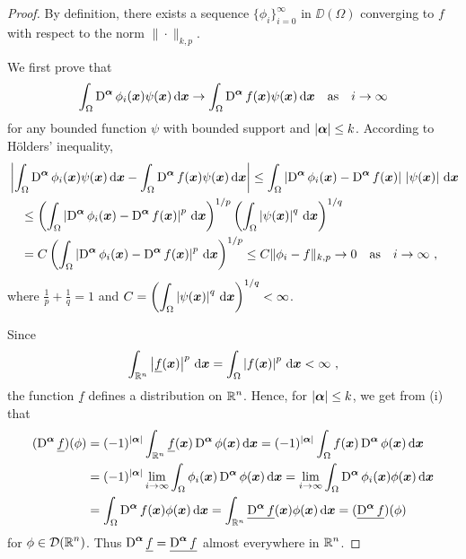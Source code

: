 \begin{proof}
By definition, there exists a sequence
$\displaystyle \{\phi_i\}_{i=0}^\infty$ in
$\DD(\Omega)$ converging to $f$ with respect to the norm
$\|\cdot\|_{k,p}$.

 We first prove that
\[
\int_\Omega \operatorname{D}^{{\bm{\alpha}}} \phi_i({\bm{x}}) \psi({\bm{x}}) \,\mathrm{d}{{\bm{x}}}
\rightarrow \int_\Omega \operatorname{D}^{{\bm{\alpha}}} f({\bm{x}}) \psi({\bm{x}})
\,\mathrm{d}{{\bm{x}}}
\quad \text{as}\quad i \rightarrow \infty
\]
for any bounded function $\psi$ with bounded support and $|{\bm{\alpha}}|\leq k$.
According to Hölders' inequality,
\begin{align*}
&\left|\int_\Omega \operatorname{D}^{{\bm{\alpha}}} \phi_i({\bm{x}}) \psi({\bm{x}})
\,\mathrm{d}{{\bm{x}}}
- \int_\Omega \operatorname{D}^{{\bm{\alpha}}} f({\bm{x}}) \psi({\bm{x}}) \,\mathrm{d}{{\bm{x}}}\right|
\leq  \int_\Omega \left| \operatorname{D}^{{\bm{\alpha}}} \phi_i({\bm{x}}) -
\operatorname{D}^{{\bm{\alpha}}} f({\bm{x}})\right|\,
\left| \psi({\bm{x}}) \right| \,\mathrm{d}{{\bm{x}}} \\
&\quad \leq \left( \int_\Omega \left| \operatorname{D}^{{\bm{\alpha}}} \phi_i({\bm{x}})
- \operatorname{D}^{{\bm{\alpha}}} f({\bm{x}})\right|^p \,\mathrm{d}{{\bm{x}}} \right)^{1/p} \left(
\int_\Omega \left| \psi({\bm{x}}) \right|^q \,\mathrm{d}{{\bm{x}}} \right)^{1/q} \\
&\quad = C \left( \int_\Omega \left| \operatorname{D}^{{\bm{\alpha}}} \phi_i({\bm{x}})
- \operatorname{D}^{{\bm{\alpha}}} f({\bm{x}})\right|^p \,\mathrm{d}{{\bm{x}}} \right)^{1/p}
\leq C \| \phi_i - f \|_{k,p} \rightarrow 0 \quad \text{as} \quad
i\rightarrow \infty \ ,
\end{align*}
where $\displaystyle \frac{1}{p}+ \frac{1}{q} = 1$ and
$\displaystyle C = \left(
\int_\Omega \left| \psi({\bm{x}}) \right|^q \,\mathrm{d}{{\bm{x}}} \right)^{1/q}
< \infty$.

 Since
\[
\int_{\RR^n} \left|\underline{f}(\VEC{x})\right|^p \dx{\VEC{x}} = 
\int_{\Omega} \left| f(\VEC{x}) \right|^p \dx{\VEC{x}} < \infty \ ,
\]
the function $\underline{f}$ defines a distribution on $\displaystyle \mathbb{R}^n$.
Hence, for $|{\bm{\alpha}}|\leq k$, we get from (i) that
\begin{align*}
(\operatorname{D}^{{\bm{\alpha}}} \underline{f})(\phi)
&= (-1)^{|{\bm{\alpha}}|} \int_{\mathbb{R}^n} \underline{f}({\bm{x}})
\operatorname{D}^{{\bm{\alpha}}} \phi({\bm{x}})\,\mathrm{d}{{\bm{x}}}
= (-1)^{|{\bm{\alpha}}|} \int_{\Omega} f({\bm{x}})
\operatorname{D}^{{\bm{\alpha}}} \phi({\bm{x}})\,\mathrm{d}{{\bm{x}}} \\
&= (-1)^{|{\bm{\alpha}}|} \lim_{i\rightarrow \infty}
\int_{\Omega} \phi_i({\bm{x}}) \operatorname{D}^{{\bm{\alpha}}} \phi({\bm{x}})\,\mathrm{d}{{\bm{x}}}
= \lim_{i\rightarrow \infty}
\int_{\Omega} \operatorname{D}^{{\bm{\alpha}}} \phi_i({\bm{x}}) \phi({\bm{x}})\,\mathrm{d}{{\bm{x}}} \\
&= \int_{\Omega} \operatorname{D}^{{\bm{\alpha}}} f({\bm{x}}) \phi({\bm{x}})\,\mathrm{d}{{\bm{x}}}
= \int_{\mathbb{R}^n} \underline{\operatorname{D}^{{\bm{\alpha}}} f}({\bm{x}})
\phi({\bm{x}})\,\mathrm{d}{{\bm{x}}}
= (\underline{\operatorname{D}^{{\bm{\alpha}}} f}) (\phi)
\end{align*}
for $\displaystyle \phi \in \mathcal{D}(\mathbb{R}^n)$.
Thus $\displaystyle \operatorname{D}^{{\bm{\alpha}}} \underline{f}
= \underline{\operatorname{D}^{{\bm{\alpha}}} f}$
almost everywhere in $\displaystyle \mathbb{R}^n$.


\end{proof}
